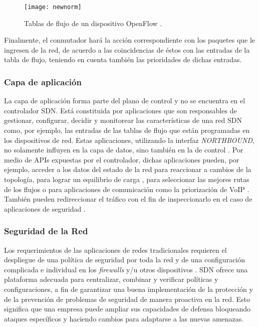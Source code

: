 \begin{figure}[H]
	\centering 
	\texttt{[image: newnorm]}
	\caption[Tablas de flujo de un dispositivo OpenFlow]{Tablas de flujo de un dispositivo OpenFlow
    \parencite{new_norm_for_networks}.}
	\label{fig:openflow_2}
\end{figure}

Finalmente, el conmutador hará la acción correspondiente con los paquetes que le
ingresen de la red, de acuerdo a las coincidencias de éstos con las entradas de
la tabla de flujo, teniendo en cuenta también las prioridades de dichas
entradas.

\subsubsection*{Capa de aplicación}
La capa de aplicación forma parte del plano de control y no se encuentra en el
controlador SDN. Está constituida por aplicaciones que son responsables de
gestionar, configurar, decidir y monitorear las características de una red SDN
como, por ejemplo, las entradas de las tablas de flujo que están programadas en
los dispositivos de red. Estas aplicaciones, utilizando la interfaz
\textit{NORTHBOUND}, no solamente influyen en la capa de datos, sino también en
la de control \parencite{sdn_simplified}. Por medio de APIs expuestas por el
controlador, dichas aplicaciones pueden, por ejemplo, acceder a los datos del
estado de la red para reaccionar a cambios de la topología, para lograr un
equilibrio de carga \parencite{load_bal}, para seleccionar las mejores rutas de
los flujos o para aplicaciones de comunicación como la priorización de VoIP
\parencite{voip}. También pueden redireccionar el tráfico con el fin de
inspeccionarlo en el caso de aplicaciones de seguridad \parencite{autoscaling}.

\subsubsection*{Seguridad de la Red} \label{sec:segnetsdn}
Los requerimientos de las aplicaciones de redes tradicionales requieren el
despliegue de una política de seguridad por toda la red y de una configuración
complicada e individual en los \textit{firewalls} \parencite{distr_firewall} y/u
otros dispositivos \parencite{detect_chi}. SDN ofrece una plataforma adecuada
para centralizar, combinar y verificar políticas y configuraciones, a fin de
garantizar una buena implementación de la protección y de la prevención de
problemas de seguridad de manera proactiva en la red. Esto significa que una
empresa puede ampliar sus capacidades de defensa bloqueando ataques específicos
y haciendo cambios para adaptarse a las nuevas amenazas.

